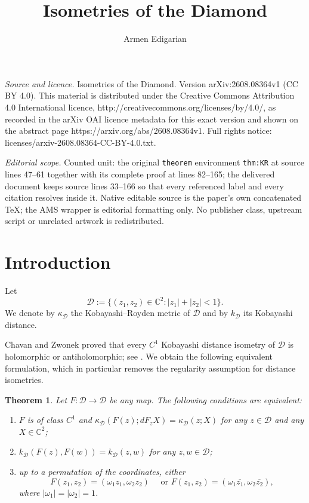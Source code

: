 \documentclass[10pt,a4paper]{amsart}
\newtheorem{theorem}{Theorem}[section]
\newcommand{\D}{\mathcal D}
\newcommand{\C}{\mathbb C}
\newcommand{\kD}{k_{\D}}
\newcommand{\kapD}{\kappa_{\D}}
\begin{document}
\title[Isometries of the Diamond]{Isometries of the Diamond}
\author{Armen Edigarian}
\date{}
\maketitle
\noindent\emph{Source and licence.} Isometries of the Diamond. Version arXiv:2608.08364v1 (CC BY 4.0). This material is distributed under the Creative Commons Attribution 4.0 International licence, http://creativecommons.org/licenses/by/4.0/, as recorded in the arXiv OAI licence metadata for this exact version and shown on the abstract page https://arxiv.org/abs/2608.08364v1. Full rights notice: licenses/arxiv-2608.08364-CC-BY-4.0.txt.\par\smallskip
\noindent\textit{Editorial scope.} Counted unit: the original \texttt{theorem} environment \texttt{thm:KR} at source lines 47--61 together with its complete proof at lines 82--165; the delivered document keeps source lines 33--166 so that every referenced label and every citation resolves inside it. Native editable source is the paper's own concatenated TeX; the AMS wrapper is editorial formatting only. No publisher class, upstream script or unrelated artwork is redistributed.
\section{Introduction}

Let
\[
\D:=\{(z_1,z_2)\in\C^2: |z_1|+|z_2|<1\}.
\]
We denote by $\kapD$ the Kobayashi--Royden metric of $\D$ and by $\kD$
its Kobayashi distance.

Chavan and Zwonek proved that every $C^1$ Kobayashi distance isometry
of $\D$ is holomorphic or antiholomorphic; see \cite{CZ}. We obtain the
following equivalent formulation, which in particular removes the
regularity assumption for distance isometries.


\begin{theorem}\label{thm:KR}
Let $F:\D\to\D$ be any map. The following conditions are equivalent:
\begin{enumerate}
\item $F$ is of class $C^1$ and
$\kapD(F(z);dF_zX)=\kapD(z;X)$ for any $z\in\D$ and any $X\in\C^2$;
\item $\kD(F(z),F(w))=\kD(z,w)$ for any $z,w\in\D$;
\item up to a permutation of the coordinates, either
\[
F(z_1,z_2)=(\omega_1z_1,\omega_2z_2)
\quad\text{ or }
F(z_1,z_2)=(\omega_1\overline{z_1},\omega_2\overline{z_2}),
\]
where $|\omega_1|=|\omega_2|=1$.
\end{enumerate}
\end{theorem}
\end{document}
